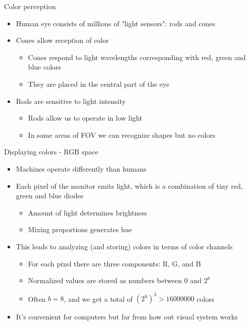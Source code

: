 \documentclass[10pt,aspectratio=169]{beamer}
\begin{document}
\begin{frame}[plain]{Color perception}
	\begin{itemize}
		\item Human eye consists of millions of "light sensors": rods and cones
		\item Cones allow reception of color
		\begin{itemize}
			\item Cones respond to light wavelengths corresponding with red, green and blue colors
			\item They are placed in the central part of the eye
		\end{itemize}
		\item Rods are sensitive to light intensity
		\begin{itemize}
			\item Rods allow us to operate in low light
			\item In some areas of FOV we can recognize shapes but no colors
		\end{itemize}
	\end{itemize}
\end{frame}

\begin{frame}[plain]{Displaying colors - RGB space}
	\begin{itemize}
		\item Machines operate differently than humans
		\item Each pixel of the monitor emits light, which is a combination of tiny red, green and blue diodes
		\begin{itemize}
			\item Amount of light determines brightness
			\item Mixing proportions generates hue
		\end{itemize}
		\item This leads to analyzing (and storing) colors in terms of color channels
		\begin{itemize}
			\item For each pixel there are three components: R, G, and B
			\item Normalized values are stored as numbers between $0$ and $2^b$
			\item Often $b=8$, and we get a total of $ \left(2^8\right)^3 > 16 000 000 $ colors
		\end{itemize}
		\item It's convenient for computers but far from how out visual system works
	\end{itemize}
\end{frame}
\end{document}
